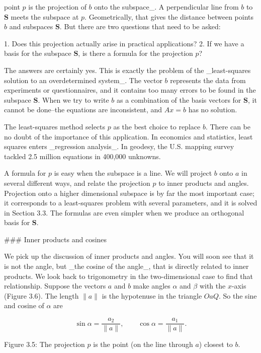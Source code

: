 point \(p\) is the projection of \(b\) onto the subspace_. A perpendicular line from \(b\) to \(\mathbf{S}\) meets the subspace at \(p\). Geometrically, that gives the distance between points \(b\) and subspaces \(\mathbf{S}\). But there are two questions that need to be asked:

1. Does this projection actually arise in practical applications?
2. If we have a basis for the subspace \(\mathbf{S}\), is there a formula for the projection \(p\)?

The answers are certainly yes. This is exactly the problem of the _least-squares solution to an overdetermined system_. The vector \(b\) represents the data from experiments or questionnaires, and it contains too many errors to be found in the subspace \(\mathbf{S}\). When we try to write \(b\) as a combination of the basis vectors for \(\mathbf{S}\), it cannot be done--the equations are inconsistent, and \(Ax=b\) has no solution.

The least-squares method selects \(p\) as the best choice to replace \(b\). There can be no doubt of the importance of this application. In economics and statistics, least squares enters _regression analysis_. In geodesy, the U.S. mapping survey tackled 2.5 million equations in 400,000 unknowns.

A formula for \(p\) is easy when the subspace is a line. We will project \(b\) onto \(a\) in several different ways, and relate the projection \(p\) to inner products and angles. Projection onto a higher dimensional subspace is by far the most important case; it corresponds to a least-squares problem with several parameters, and it is solved in Section 3.3. The formulas are even simpler when we produce an orthogonal basis for \(\mathbf{S}\).

### Inner products and cosines

We pick up the discussion of inner products and angles. You will soon see that it is not the angle, but _the cosine of the angle_, that is directly related to inner products. We look back to trigonometry in the two-dimensional case to find that relationship. Suppose the vectors \(a\) and \(b\) make angles \(\alpha\) and \(\beta\) with the \(x\)-axis (Figure 3.6). The length \(\|a\|\) is the hypotenuse in the triangle \(OaQ\). So the sine and cosine of \(\alpha\) are

\[\sin\alpha=\frac{a_{2}}{\|a\|},\qquad\cos\alpha=\frac{a_{1}}{\|a\|}.\]

Figure 3.5: The projection \(p\) is the point (on the line through \(a\)) closest to \(b\).

 